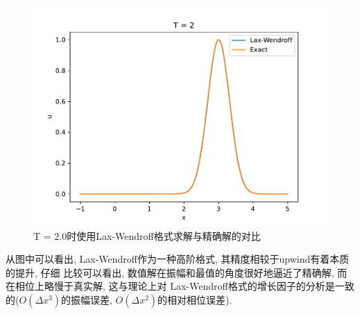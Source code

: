 \documentclass[a4paper,zihao=5,UTF8]{ctexart}
\begin{document}
	\begin{figure}[htbp]
		\centering
		\includegraphics[scale=0.7]{3_3_LW_2_0.pdf}
		\caption{T = 2.0时使用Lax-Wendroff格式求解与精确解的对比}
		\label{3-3-LW-T2.0}
	\end{figure}
	从图中可以看出, Lax-Wendroff作为一种高阶格式, 其精度相较于upwind有着本质的提升, 仔细
	比较可以看出, 数值解在振幅和最值的角度很好地逼近了精确解, 而在相位上略慢于真实解, 这与理论上对
	Lax-Wendroff格式的增长因子的分析是一致的($O(\Delta x^3)$的振幅误差, $O(\Delta x^2)$的相对相位误差). 
\end{document}
